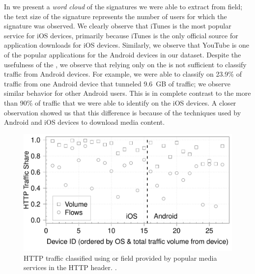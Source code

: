 In  we present a \emph{word cloud} of the signatures we were able to extract from \useragent field; the text size of the signature represents the number of users for which the signature was observed.
We clearly observe that iTunes is the most popular service for iOS devices, primarily because iTunes is the only official source for application downloads for iOS devices. 
Similarly, we observe that YouTube is one of the popular applications for the Android devices in our dataset.
Despite the usefulness of the \useragent, we observe that relying only on the \useragent is not sufficient to classify traffic from Android devices. 
For example, we were able to classify on 23.9\% of traffic from one Android device that tunneled 9.6~GB of traffic; we observe similar behavior for other Android users.
This is in complete contrast to the more than 90\% of traffic that we were able to identify on the iOS devices. 
A closer observation showed us that this difference is because of the techniques used by Android and iOS devices to download media content. 

\begin{figure}
\includegraphics[width=\columnwidth]{plots/appusage_someappservicesig_traffic.pdf}
\caption{HTTP traffic classified using \useragent or \httphost field provided by popular media services in the HTTP header. \emph{.}}
\label{fig:http-classification-app-user-agent-host}
\end{figure}

